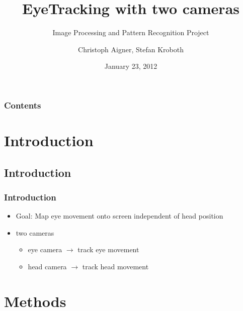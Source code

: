 \documentclass[%
14pt
]{beamer}
\title{EyeTracking with two cameras}
\subtitle{Image Processing and Pattern Recognition Project}
\author{Christoph Aigner, Stefan Kroboth}
\date{January 23, 2012}		%
\begin{document}

\begin{frame}[plain]
  \frametitle{}
  \titlepage %
\end{frame}



\begin{frame}
  \frametitle{Contents}
  \begin{spacing}{0.7}
        \tableofcontents[hideallsubsections %
                        ] %
                      \end{spacing}
\end{frame}

\section{Introduction}
\subsection{Introduction}
\begin{frame}
	\frametitle{Introduction}
  \begin{itemize}
    \item Goal: Map eye movement onto screen independent of head position
    \item two cameras
      \begin{itemize}
        \item eye camera $\rightarrow$ track eye movement
        \item head camera $\rightarrow$ track head movement
      \end{itemize}
  \end{itemize}
\end{frame}

\section{Methods}
\end{document}
